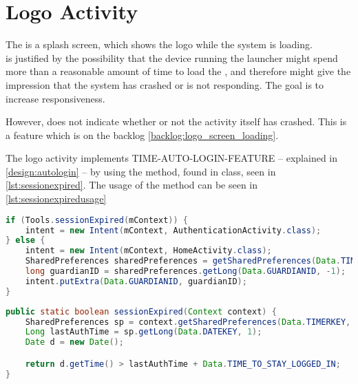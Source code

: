 \section{Logo Activity}
The  is a splash screen, which shows the \giraf[] logo while the system is loading. \\
 is justified by the possibility that the device running the launcher might spend more than a reasonable amount of time to load the , and therefore might give the impression that the system has crashed or is not responding. The goal is to increase responsiveness.

However,  does not indicate whether or not the activity itself has crashed. This is a feature which is on the backlog \autoref{backlog:logo_screen_loading}.

The logo activity implements TIME-AUTO-LOGIN-FEATURE -- explained in \autoref{design:autologin} -- by using the  method, found in  class, seen in \autoref{lst:sessionexpired}.
The usage of the  method can be seen in \autoref{lst:sessionexpiredusage}

\begin{lstlisting}[style=sourceCode, language=JAVA, caption=Snippet of: LogoActivity.java, label=lst:sessionexpiredusage] 
if (Tools.sessionExpired(mContext)) {
	intent = new Intent(mContext, AuthenticationActivity.class);
} else {
	intent = new Intent(mContext, HomeActivity.class);
	SharedPreferences sharedPreferences = getSharedPreferences(Data.TIMERKEY, 0);
	long guardianID = sharedPreferences.getLong(Data.GUARDIANID, -1);
	intent.putExtra(Data.GUARDIANID, guardianID);
}
\end{lstlisting}


\begin{lstlisting}[style=sourceCode, language=JAVA, caption=Snippet of: Tools.java, label=lst:sessionexpired]
public static boolean sessionExpired(Context context) {
	SharedPreferences sp = context.getSharedPreferences(Data.TIMERKEY, 0);
	Long lastAuthTime = sp.getLong(Data.DATEKEY, 1);
	Date d = new Date();

	return d.getTime() > lastAuthTime + Data.TIME_TO_STAY_LOGGED_IN;
}
	\end{lstlisting}